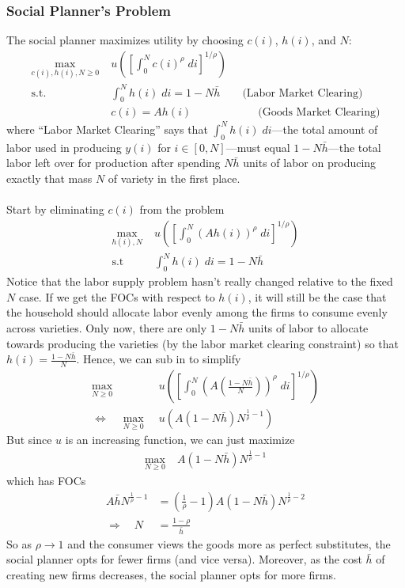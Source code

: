 \documentclass[12pt]{article}
\theoremstyle{plain}
\theoremstyle{definition}
\theoremstyle{remark}
\newcommand{\ra}{\rightarrow}
\newcommand{\intzN}{\int_0^N}
\begin{document}
\clearpage
\subsubsection{Social Planner's Problem}

The social planner maximizes utility by choosing $c(i)$, $h(i)$, and
$N$:
\begin{align*}
  \max_{c(i),h(i),N\geq 0}
    & \; u\left(
      \left[ \int_0^N c(i)^\rho \; di \right]^{1/\rho}
    \right)
  \\
  \text{s.t.} & \;
  \intzN h(i) \; di = 1 - N\bar{h}
  \qquad
  \text{(Labor Market Clearing)} \\
  &\; c(i) = Ah(i)
  \qquad\qquad\qquad
  \text{(Goods Market Clearing)}
\end{align*}
where ``Labor Market Clearing'' says that  $\intzN h(i)\; di$---the
total amount of labor used in producing $y(i)$ for $i\in[0,N]$---must
equal $1-N\bar{h}$---the total labor left over for production after
spending $N\bar{h}$ units of labor on producing exactly that mass $N$ of
variety in the first place.
\\
\\
Start by eliminating $c(i)$ from the problem
\begin{align*}
  \max_{h(i),N}
    & \; u\left(
      \left[ \int_0^N \left(Ah(i)\right)^\rho \; di \right]^{1/\rho}
    \right)
  \\
  \text{s.t} & \;
  \intzN h(i) \; di = 1 - N\bar{h}
\end{align*}
Notice that the labor supply problem hasn't really changed relative to
the fixed $N$ case. If we get the FOCs with respect to $h(i)$, it will
still be the case that the household should allocate labor evenly among
the firms to consume evenly across varieties. Only now, there are only
$1-N\bar{h}$ units of labor to allocate towards producing the varieties
(by the labor market clearing constraint) so that
$h(i)=\frac{1-N\bar{h}}{N}$. Hence, we can sub in to simplify
\begin{align*}
  \max_{N\geq 0}
    & \; u\left(
      \left[ \int_0^N
      \left(A\left(\frac{1-N\bar{h}}{N}\right)\right)^\rho \; di
    \right]^{1/\rho}
    \right) \\
  \Leftrightarrow\quad
  \max_{N\geq 0}
    & \; u\left(
      A(1-N\bar{h})
      N^{\frac{1}{\rho}-1}
    \right)
\end{align*}
But since $u$ is an increasing function, we can just maximize
\begin{align*}
  \max_{N\geq 0}
    & \;
      A(1-N\bar{h})
      N^{\frac{1}{\rho}-1}
\end{align*}
which has FOCs
\begin{align*}
  A\bar{h} N^{\frac{1}{\rho}-1}
  &=
  \left(\frac{1}{\rho}-1\right)
  A(1-N\bar{h}) N^{\frac{1}{\rho}-2} \\
  \Rightarrow\quad
  N &= \frac{1-\rho}{\bar{h}}
\end{align*}
So as $\rho\ra 1$ and the consumer views the goods more as perfect
substitutes, the social planner opts for fewer firms (and vice versa).
Moreover, as the cost $\bar{h}$ of creating new firms decreases, the
social planner opts for more firms.
\end{document}

